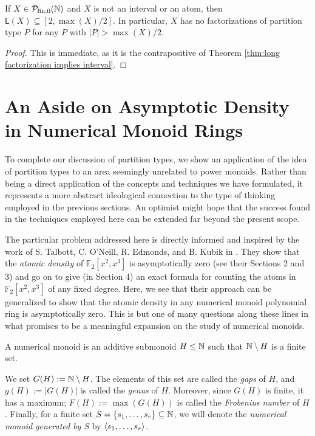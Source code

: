 \begin{cor}
If $X\in {\mathcal{P}_{\textrm{fin},0}(\mathbb{N})}$ and $X$ is not an interval or an atom, then $\mathsf{L}(X) \subseteq [2,\max(X)/2]$.
In particular, $X$ has no factorizations of partition type $P$ for any $P$ with $|P| > \max(X)/2$.
\end{cor}

\begin{proof}
This is immediate, as it is the contrapositive of Theorem \ref{thm:long factorization implies interval}.
\end{proof}


\section{An Aside on Asymptotic Density in Numerical Monoid Rings} \label{sec:numerical monoid ring density}
To complete our discussion of partition types, we show an application of the idea of partition types to an area seemingly unrelated to power monoids.  
Rather than being a direct application of the concepts and techniques we have formulated, it represents a more abstract ideological connection to the type of thinking employed in the previous sections.  
An optimist might hope that the success found in the techniques employed here can be extended far beyond the present scope.

The particular problem addressed here is directly informed and inspired by the work of S. Talbott, C. O'Neill, R. Edmonds, and B. Kubik in \cite{CRBS20}.
They show that the \textit{atomic density} of $\mathbb{F}_2[x^2,x^3]$ is asymptotically zero (see their Sections 2 and 3) and go on to give (in Section 4) an exact formula for counting the atoms in $\mathbb{F}_2[x^2,x^3]$ of any fixed degree.
Here, we see that their approach can be generalized to show that the atomic density in any numerical monoid polynomial ring is asymptotically zero.
This is but one of many questions along these lines in what promises to be a meaningful expansion on the study of numerical monoids.

\begin{defn}
	A numerical monoid is an additive submonoid $H \le \mathbb{N}$ such that $\mathbb{N}\setminus H$ is a finite set.  
	
	We set $G(H) := \mathbb{N} \setminus H$. 
	The elements of this set are called the \textit{gaps} of $H$, and $g(H) := |G(H)|$ is called the \textit{genus} of $H$.
	Moreover, since $G(H)$ is finite, it has a maximum; $F(H) := \max(G(H))$ is called the \textit{Frobenius number} of $H$.
	Finally, for a finite set $S = \{s_1,\dots, s_r\}\subseteq \mathbb{N}$, we will denote the \textit{numerical monoid generated by $S$} by $\langle s_1,\dots,s_r \rangle$.
\end{defn}


